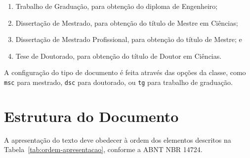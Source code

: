 \begin{enumerate}
    \item Trabalho de Graduação, para obtenção do diploma de Engenheiro;
    \item Dissertação de Mestrado, para obtenção do título de Mestre em Ciências;
    \item Dissertação de Mestrado Profissional, para obtenção do título de Mestre; e
    \item Tese de Doutorado, para obtenção do título de Doutor em Ciências.
\end{enumerate}

A configuração do tipo de documento é feita através das opções da classe, como \texttt{msc} para mestrado, \texttt{dsc} para doutorado, ou \texttt{tg} para trabalho de graduação.

\section{Estrutura do Documento}

A apresentação do texto deve obedecer à ordem dos elementos descritos na Tabela~\ref{tab:ordem-apresentacao}, conforme a ABNT NBR 14724.

